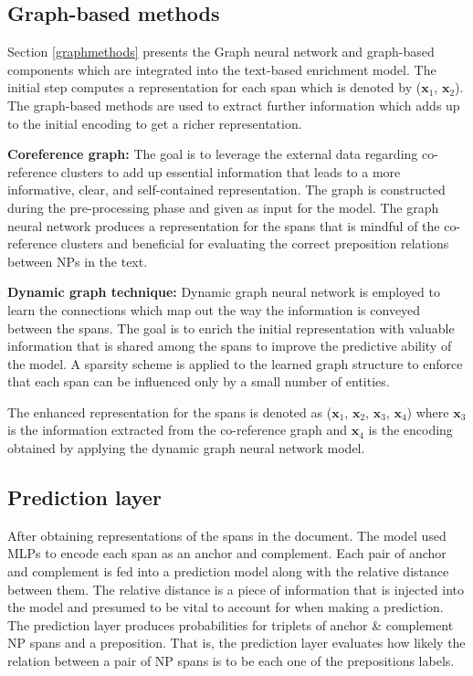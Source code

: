 \documentclass[11pt, a4paper, twocolumn]{article}
\begin{document}
\subsection{Graph-based methods}
\label{graphbasedmethods}

Section \ref{graphmethods} presents the Graph neural network and graph-based components which are integrated into the text-based enrichment model.
The initial step computes a representation for each span which is denoted by ($\mathbf{x}_1$, $\mathbf{x}_2$).
The graph-based methods are used to extract further information which adds up to the initial encoding to get a richer representation.

\textbf{Coreference graph:} The goal is to leverage the external data regarding co-reference clusters to add up essential information that leads to a more informative, clear, and self-contained representation.
The graph is constructed during the pre-processing phase and given as input for the model. The graph neural network produces a representation for the spans that is mindful of the co-reference clusters and beneficial for evaluating the correct preposition relations between NPs in the text.

\textbf{Dynamic graph technique:} Dynamic graph neural network is employed to learn the connections which map out the way the information is conveyed between the spans. The goal is to enrich the initial representation with valuable information that is shared among the spans to improve the predictive ability of the model.
A sparsity scheme is applied to the learned graph structure to enforce that each span can be influenced only by a small number of entities.

The enhanced representation for the spans is denoted as ($\mathbf{x}_1$, $\mathbf{x}_2$, $\mathbf{x}_3$, $\mathbf{x}_4$) where
$\mathbf{x}_3$ is the information extracted from the co-reference graph and $\mathbf{x}_4$ is the encoding obtained by applying the dynamic graph neural network model.

\subsection{Prediction layer}
\label{predictionlayer}

After obtaining representations of the spans in the document. The model used MLPs to encode each span as an anchor and complement.
Each pair of anchor and complement is fed into a prediction model along with the relative distance between them. The relative distance is a piece of information that is injected into the model and presumed to be vital to account for when making a prediction. The prediction layer produces probabilities for triplets of anchor \& complement NP spans and a preposition. That is, the prediction layer evaluates how likely the relation between a pair of NP spans is to be each one of the prepositions labels.
\end{document}
